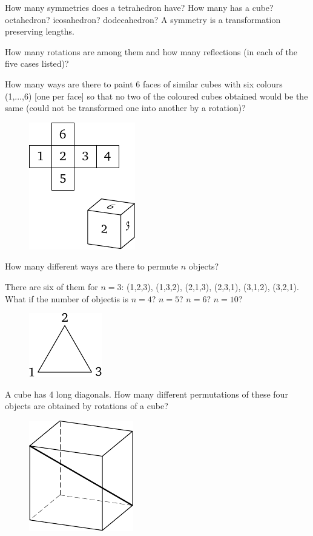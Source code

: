 \documentclass[12pt]{article}  %
\begin{document}
 How many symmetries does a tetrahedron have? How many has a cube? octahedron? icosahedron?
dodecahedron? A symmetry is a transformation preserving lengths.

How many rotations are among them and how many reflections (in each of the five cases listed)?

\bigskip
{} How many ways are there to paint 6 faces of similar cubes with six colours (1,...,6) [one per face]
so that no two of the coloured cubes obtained would be the same (could not be transformed one into another
by a rotation)? 
\begin{figure}[h]
\centering
 \includegraphics{taskbook-17}
\end{figure}

 How many different ways are there to permute $n$ objects?

There are six of them for $n=3$: (1,2,3), (1,3,2), (2,1,3), (2,3,1), (3,1,2), (3,2,1). What if the number of objectis is $n=4$? $n=5$? $n=6$? $n=10$?
\begin{figure}[h]
\centering
\includegraphics{taskbook-18}
\end{figure}

 A cube has 4 long diagonals. How many different permutations of these four objects are obtained by rotations of a cube?
\begin{figure}[h]
\centering
\includegraphics{taskbook-19}
\end{figure}
\end{document}
